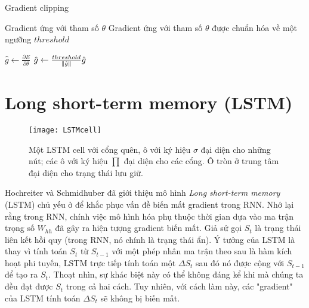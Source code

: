 \begin{algorithm}
	\caption{Gradient clipping}
	\label{alg_GDClipping}
	\begin{algorithmic}[1]
		\renewcommand{\algorithmicrequire}{\textbf{Đầu vào:}}
		\renewcommand{\algorithmicensure}{\textbf{Đầu ra:}}
		\algnewcommand{}
		\algnewcommand\Operation{\item[\algorithmicoperation]}
		
		\Require Gradient ứng với tham số $\theta$
		\Ensure Gradient ứng với tham số $\theta$ được chuẩn hóa về một ngưỡng $threshold$
		
		\Operation
		\State $\hat{g} \leftarrow \frac{\partial E}{\partial \theta}$
			\State $\hat{g} \leftarrow \frac{threshold}{\left\lVert\hat{g}\right\rVert} \hat{g}$
		\EndIf
	\end{algorithmic}
\end{algorithm}

\section{Long short-term memory (LSTM)}

\begin{figure}
	\centering
	\texttt{[image: LSTMcell]}
	\caption[Một LSTM cell]{Một LSTM cell với cổng quên, ô với ký hiệu $\sigma$ đại diện cho những nút; các ô với ký hiệu $\prod$ đại diện cho các cổng. Ô tròn ở trung tâm đại diện cho trạng thái lưu giữ.}
	\label{fig_lstmCell}
\end{figure}

Hochreiter và Schmidhuber \cite{hochreiter1997} đã giới thiệu mô hình \textit{Long short-term memory} (LSTM) chủ yếu ở để khắc phục vấn đề biến mất gradient trong RNN. Nhớ lại rằng trong RNN, chính việc mô hình hóa phụ thuộc thời gian dựa vào ma trận trọng số $W_{hh}$ đã gây ra hiện tượng gradient biến mất. Giả sử gọi $S_t$ là trạng thái liên kết hồi quy (trong RNN, nó chính là trạng thái ẩn). Ý tưởng của LSTM là thay vì tính toán $S_t$ từ $S_{t-1}$ với một phép nhân ma trận theo sau là hàm kích hoạt phi tuyến, LSTM trực tiếp tính toán một $\Delta S_t$ sau đó nó được cộng với $S_{t-1}$ để tạo ra $S_t$. Thoạt nhìn, sự khác biệt này có thể không đáng kể khi mà chúng ta đều đạt được $S_t$ trong cả hai cách. Tuy nhiên, với cách làm này, các "gradient" của LSTM tính toán $\Delta S_t$ sẽ không bị biến mất.

